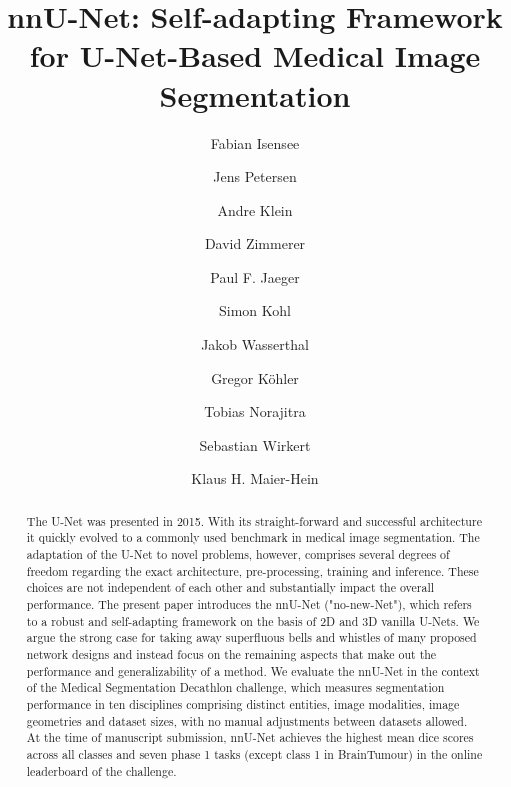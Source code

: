 \documentclass{templates/llncs}
\begin{document}


\title{nnU-Net: Self-adapting Framework \\for U-Net-Based Medical Image Segmentation}





\author{
Fabian Isensee \and
Jens Petersen \and
Andre Klein \and
David Zimmerer \and
Paul F. Jaeger \and
Simon Kohl \and
Jakob Wasserthal \and
Gregor K\"ohler \and
Tobias Norajitra \and
Sebastian Wirkert \and
Klaus H. Maier-Hein}
 \tocauthor{**************, **************, **************}

\maketitle   


\begin{abstract}



The U-Net was presented in 2015. With its straight-forward and successful architecture it quickly evolved to a commonly used benchmark in medical image segmentation. The adaptation of the U-Net to novel problems, however, comprises several degrees of freedom regarding the exact architecture, pre-processing, training and inference. These choices are not independent of each other and substantially impact the overall performance. The present paper introduces the nnU-Net ("no-new-Net"), which refers to a robust and self-adapting framework on the basis of 2D and 3D vanilla U-Nets. We argue the strong case for taking away superfluous bells and whistles of many proposed network designs and instead focus on the remaining aspects that make out the performance and generalizability of a method. We evaluate the nnU-Net in the context of the Medical Segmentation Decathlon challenge, which measures segmentation performance in ten disciplines comprising distinct entities, image modalities, image geometries and dataset sizes, with no manual adjustments between datasets allowed. At the time of manuscript submission, nnU-Net achieves the highest mean dice scores across all classes and seven phase 1 tasks (except class 1 in BrainTumour) in the online leaderboard of the challenge.

\end{abstract}
\end{document}
